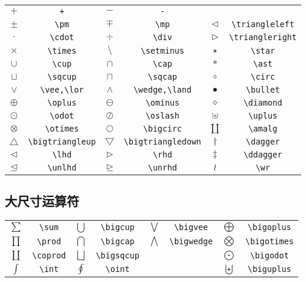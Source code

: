 \begin{table}[H]
\centering
\begin{tabular}{*{6}{c}}
$+ $&\verb|+| &$- $&\verb|-| && \\
$\pm $&\verb|\pm| &$\mp $&\verb|\mp| &$\triangleleft $&\verb|\triangleleft| \\
$\cdot $&\verb|\cdot| &$\div $&\verb|\div| &$\triangleright $&\verb|\triangleright| \\
$\times $&\verb|\times| &$\setminus $&\verb|\setminus| &$\star $&\verb|\star| \\
$\cup $&\verb|\cup| &$\cap $&\verb|\cap| &$\ast $&\verb|\ast| \\
$\sqcup $&\verb|\sqcup| &$\sqcap $&\verb|\sqcap| &$\circ $&\verb|\circ| \\
$\vee $&\verb|\vee,\lor| &$\wedge $&\verb|\wedge,\land| &$\bullet $&\verb|\bullet| \\
$\oplus $&\verb|\oplus| &$\ominus $&\verb|\ominus| &$\diamond $&\verb|\diamond| \\
$\odot $&\verb|\odot| &$\oslash$&\verb|\oslash| &$\uplus $&\verb|\uplus| \\
$\otimes $&\verb|\otimes| &$\bigcirc$&\verb|\bigcirc| &$\amalg $&\verb|\amalg| \\
$\bigtriangleup $&\verb|\bigtriangleup| &$\bigtriangledown $&\verb|\bigtriangledown| &$\dagger $&\verb|\dagger| \\
$\lhd$&\verb|\lhd|\hyperlink{latexsym}{\footnotemark[1]} &$\rhd $&\verb|\rhd|\hyperlink{latexsym}{\footnotemark[1]} &$\ddagger $&\verb|\ddagger| \\
$\unlhd $&\verb|\unlhd|\hyperlink{latexsym}{\footnotemark[1]} &$\unrhd $&\verb|\unrhd|\hyperlink{latexsym}{\footnotemark[1]} &$\wr $&\verb|\wr|
\end{tabular}
\end{table}

\subsection{大尺寸运算符}

\begin{table}[H]
\centering
\begin{tabular}{*{8}{c}}
$\sum $ & \verb|\sum| &$\bigcup $ & \verb|\bigcup| &$\bigvee $ & \verb|\bigvee| &$ \bigoplus$ & \verb|\bigoplus| \\
$\prod $ & \verb|\prod| &$\bigcap $ & \verb|\bigcap| &$\bigwedge $ & \verb|\bigwedge| &$ \bigotimes$ & \verb|\bigotimes| \\
$\coprod $ & \verb|\coprod| &$\bigsqcup $ & \verb|\bigsqcup| & & &$\bigodot $ & \verb|\bigodot| \\
$ \int$ & \verb|\int| &$\oint $ & \verb|\oint| & & &$ \biguplus$ & \verb|\biguplus| 
\end{tabular}
\end{table}

